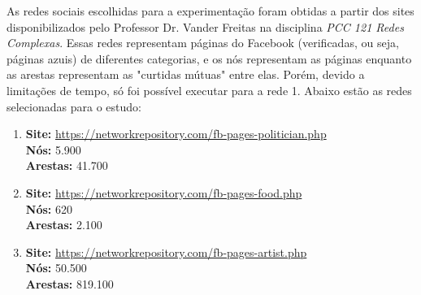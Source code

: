 \documentclass[12pt]{article}
\begin{document}
As redes sociais escolhidas para a experimentação foram obtidas a partir dos sites disponibilizados pelo Professor Dr. Vander Freitas na disciplina \textit{PCC 121 Redes Complexas}. Essas redes representam páginas do Facebook (verificadas, ou seja, páginas azuis) de diferentes categorias, e os nós representam as páginas enquanto as arestas representam as "curtidas mútuas" entre elas. Porém, devido a limitações de tempo, só foi possível executar para a rede 1. Abaixo estão as redes selecionadas para o estudo:

\begin{enumerate}
    \item \textbf{Site:} \url{https://networkrepository.com/fb-pages-politician.php} \\
    \textbf{Nós:} 5.900 \\
    \textbf{Arestas:} 41.700
    
    \item \textbf{Site:} \url{https://networkrepository.com/fb-pages-food.php} \\
    \textbf{Nós:} 620 \\
    \textbf{Arestas:} 2.100
    
    \item \textbf{Site:} \url{https://networkrepository.com/fb-pages-artist.php} \\
    \textbf{Nós:} 50.500 \\
    \textbf{Arestas:} 819.100
\end{enumerate}



    
\end{document}
